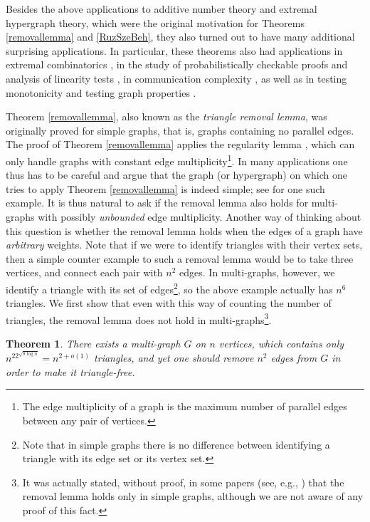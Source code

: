 \documentclass [letterpaper,11pt]{article}
\newtheorem{theo}{Theorem}%
\begin{document}
Besides the above applications to additive number theory and
extremal hypergraph theory, which were the original motivation for Theorems
\ref{removallemma} and \ref{RuzSzeBeh}, they also turned out to have
many additional surprising applications. In particular, these
theorems also had applications in extremal combinatorics
\cite{Fure,CEMZ}, in the study of probabilistically checkable proofs
and analysis of linearity tests \cite{HW}, in communication
complexity \cite{PS}, as well as in testing monotonicity
\cite{FLNRRS} and testing graph properties \cite{Alon,AS}.

Theorem \ref{removallemma}, also known as the {\em triangle removal
lemma}, was originally proved for simple graphs, that is, graphs
containing no parallel edges. The proof of Theorem
\ref{removallemma} applies the regularity lemma \cite{Sz}, which can
only handle graphs with constant edge multiplicity\footnote{The edge
multiplicity of a graph is the maximum number of parallel edges
between any pair of vertices.}. In many applications one thus has to
be careful and argue that the graph (or hypergraph) on which one
tries to apply Theorem \ref{removallemma} is indeed simple; see
\cite{S} for one such example. It is thus natural to ask if the
removal lemma also holds for multi-graphs with possibly {\em
unbounded} edge multiplicity. Another way of thinking about this
question is whether the removal lemma holds when the edges of a
graph have {\em arbitrary} weights. Note that if we were to identify
triangles with their vertex sets, then a simple counter example to
such a removal lemma would be to take three vertices, and connect
each pair with $n^2$ edges. In multi-graphs, however, we identify a
triangle with its set of edges\footnote{Note that in simple graphs
there is no difference between identifying a triangle with its edge
set or its vertex set.}, so the above example actually has $n^6$
triangles. We first show that even with this way of counting the
number of triangles, the removal lemma does not hold in
multi-graphs\footnote{It was actually stated, without proof, in some
papers (see, e.g., \cite{Kral2}) that the removal lemma holds only
in simple graphs, although we are not aware of any proof of this
fact. }.

\begin{theo}\label{theoparaupper}
There exists a multi-graph $G$ on $n$ vertices, which contains only
$n^22^{\sqrt{8\log n}}=n^{2+o(1)}$ triangles, and yet one should
remove $n^2$ edges from $G$ in order to make it triangle-free.
\end{theo}
\end{document}

